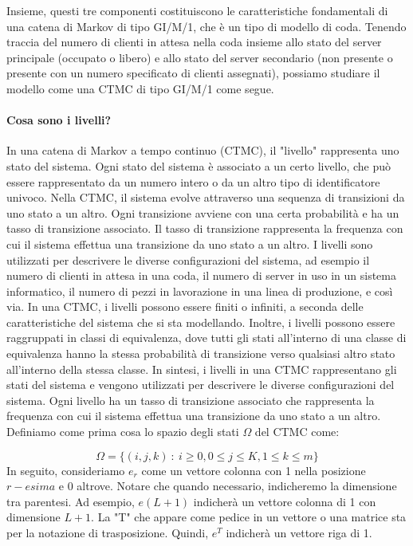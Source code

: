 \documentclass[11pt]{article}
\begin{document}
Insieme, questi tre componenti costituiscono le caratteristiche fondamentali di una catena di Markov di tipo GI/M/1, che è un tipo di modello di coda. Tenendo traccia del numero di clienti in attesa nella coda insieme allo stato del server principale (occupato o libero) e allo stato del server secondario (non presente o presente con un numero specificato di clienti assegnati), possiamo studiare il modello come una CTMC di tipo GI/M/1 come segue. \vspace*{0.4cm}

\paragraph{Cosa sono i livelli?} In una catena di Markov a tempo continuo (CTMC), il "livello" rappresenta uno stato del sistema. Ogni stato del sistema è associato a un certo livello, che può essere rappresentato da un numero intero o da un altro tipo di identificatore univoco. Nella CTMC, il sistema evolve attraverso una sequenza di transizioni da uno stato a un altro. Ogni transizione avviene con una certa probabilità e ha un tasso di transizione associato. Il tasso di transizione rappresenta la frequenza con cui il sistema effettua una transizione da uno stato a un altro.
I livelli sono utilizzati per descrivere le diverse configurazioni del sistema, ad esempio il numero di clienti in attesa in una coda, il numero di server in uso in un sistema informatico, il numero di pezzi in lavorazione in una linea di produzione, e così via. In una CTMC, i livelli possono essere finiti o infiniti, a seconda delle caratteristiche del sistema che si sta modellando. Inoltre, i livelli possono essere raggruppati in classi di equivalenza, dove tutti gli stati all'interno di una classe di equivalenza hanno la stessa probabilità di transizione verso qualsiasi altro stato all'interno della stessa classe. In sintesi, i livelli in una CTMC rappresentano gli stati del sistema e vengono utilizzati per descrivere le diverse configurazioni del sistema. Ogni livello ha un tasso di transizione associato che rappresenta la frequenza con cui il sistema effettua una transizione da uno stato a un altro. \\

\noindent Definiamo come prima cosa lo spazio degli stati $\Omega$ del CTMC come:

\begin{equation}
    \Omega = \{ (i,j,k) ~ : ~ i \geq 0, 0 \leq j \leq K, 1 \leq k \leq m \}
\end{equation}
In seguito, consideriamo $e_r$ come un vettore colonna con 1 nella posizione $r-esima$ e 0 altrove. Notare che quando necessario, indicheremo la dimensione tra parentesi. Ad esempio, $e(L + 1)$ indicherà un vettore colonna di 1 con dimensione $L+1$. La "T" che appare come pedice in un vettore o una matrice sta per la notazione di trasposizione. Quindi, $e^T$ indicherà un vettore riga di 1. \vspace*{0.4cm}
\end{document}
